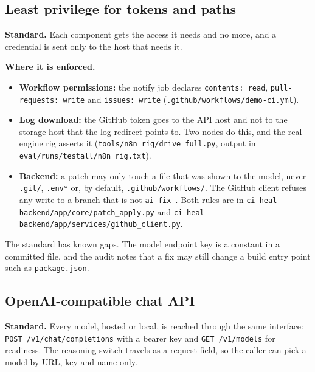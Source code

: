 \subsection{Least privilege for tokens and paths}

\textbf{Standard.} Each component gets the access it needs and no more, and a credential is sent only to the host that needs it.

\textbf{Where it is enforced.}
\begin{itemize}
  \item \textbf{Workflow permissions:} the notify job declares \texttt{contents: read}, \texttt{pull-requests: write} and \texttt{issues: write} (\texttt{.github/\allowbreak{}workflows/\allowbreak{}demo-ci.yml}).
  \item \textbf{Log download:} the GitHub token goes to the API host and not to the storage host that the log redirect points to. Two nodes do this, and the real-engine rig asserts it (\texttt{tools/\allowbreak{}n8n\_\allowbreak{}rig/\allowbreak{}drive\_\allowbreak{}full.py}, output in \texttt{eval/\allowbreak{}runs/\allowbreak{}testall/\allowbreak{}n8n\_\allowbreak{}rig.txt}).
  \item \textbf{Backend:} a patch may only touch a file that was shown to the model, never \texttt{.git/}, \texttt{.env*} or, by default, \texttt{.github/workflows/}. The GitHub client refuses any write to a branch that is not \texttt{ai-fix-}. Both rules are in \texttt{ci-heal-backend/\allowbreak{}app/\allowbreak{}core/\allowbreak{}patch\_\allowbreak{}apply.py} and \texttt{ci-heal-backend/\allowbreak{}app/\allowbreak{}services/\allowbreak{}github\_\allowbreak{}client.py}.
\end{itemize}

The standard has known gaps. The model endpoint key is a constant in a committed file, and the audit notes that a fix may still change a build entry point such as \texttt{package.json}.

\subsection{OpenAI-compatible chat API}

\textbf{Standard.} Every model, hosted or local, is reached through the same interface: \texttt{POST /v1/chat/completions} with a bearer key and \texttt{GET /v1/models} for readiness. The reasoning switch travels as a request field, so the caller can pick a model by URL, key and name only.

